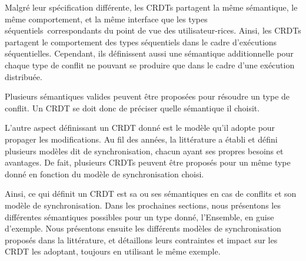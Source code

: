 Malgré leur spécification différente, les \acp{CRDT} partagent la même sémantique, \ie le même comportement, et la même interface que les types séquentiels\footnotemark \  correspondants du point de vue des utilisateur-rices.
Ainsi, les \acp{CRDT} partagent le comportement des types séquentiels dans le cadre d'exécutions séquentielles.
Cependant, ils définissent aussi une sémantique additionnelle pour chaque type de conflit ne pouvant se produire que dans le cadre d'une exécution distribuée.

Plusieurs sémantiques valides peuvent être proposées pour résoudre un type de conflit.
Un \ac{CRDT} se doit donc de préciser quelle sémantique il choisit.

L'autre aspect définissant un \ac{CRDT} donné est le modèle qu'il adopte pour propager les modifications.
Au fil des années, la littérature a établi et défini plusieurs modèles dit de synchronisation, chacun ayant ses propres besoins et avantages.
De fait, plusieurs \acp{CRDT} peuvent être proposés pour un même type donné en fonction du modèle de synchronisation choisi.

Ainsi, ce qui définit un \ac{CRDT} est sa ou ses sémantiques en cas de conflits et son modèle de synchronisation.
Dans les prochaines sections, nous présentons les différentes sémantiques possibles pour un type donné, l'Ensemble, en guise d'exemple.
Nous présentons ensuite les différents modèles de synchronisation proposés dans la littérature, et détaillons leurs contraintes et impact sur les \ac{CRDT} les adoptant, toujours en utilisant le même exemple.



